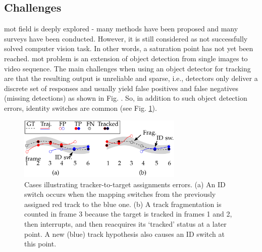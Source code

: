\begin{introduction}
\section{Challenges}
    \gls{mot} field is deeply explored - many methods have been proposed and many surveys have been conducted. However, it is still considered as not successfully solved computer vision task. In other words, a saturation point has not yet been reached. \gls{mot} problem is an extension of object detection from single images to video sequence. 
    The main challenges when using an object detector for tracking are that the resulting output is unreliable and sparse, i.e., detectors only deliver a discrete set of responses and usually yield false positives and false negatives (missing detections) as shown in Fig. . So, in addition to such object detection errors, identity switches are common (see Fig. \ref{fig:idswitchdiagram}). 

    
    \begin{figure}[h]
      \centering
      \includegraphics[width=0.7\textwidth]{resources/tracking_errors.png}
      \caption{Cases illustrating tracker-to-target assignments errors. (a) An ID switch occurs when the mapping switches from the previously assigned red track to the blue one. (b) A track fragmentation is counted in frame 3 because the target is tracked in frames 1 and 2, then interrupts, and then reacquires its ‘tracked’ status at a later point. A new (blue) track hypothesis also causes an ID switch at this point. \cite{MOTChallenge2015}}
      \label{fig:idswitchdiagram}
    \end{figure}
    

\end{introduction}
